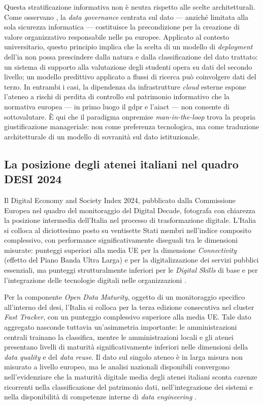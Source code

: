 Questa stratificazione informativa non è neutra rispetto alle scelte architetturali.
Come osservano \textcite{Aguilar2026}, la \textit{data governance} centrata sul dato
--- anziché limitata alla sola sicurezza informatica --- costituisce la precondizione per
la creazione di valore organizzativo responsabile nelle \gls{pa} europee. Applicato al contesto
universitario, questo principio implica che la scelta di un modello di \textit{deployment}
dell'\gls{ia} non possa prescindere dalla natura e dalla classificazione del dato trattato: un
sistema di supporto alla valutazione degli studenti opera su dati del secondo livello;
un modello predittivo applicato a flussi di ricerca può coinvolgere dati del terzo. In
entrambi i casi, la dipendenza da infrastrutture \textit{cloud} esterne espone l'ateneo a
rischi di perdita di controllo sul patrimonio informativo che la normativa europea
--- in primo luogo il \gls{gdpr} e l'\gls{aiact} --- non consente di sottovalutare. È qui che il
paradigma \gls{onpremise} \textit{man-in-the-loop} trova la propria giustificazione
manageriale: non come preferenza tecnologica, ma come traduzione architetturale di un
modello di sovranità sul dato istituzionale.

\subsection{La posizione degli atenei italiani nel quadro DESI 2024}

Il Digital Economy and Society Index 2024, pubblicato dalla Commissione Europea nel
quadro del monitoraggio del Digital Decade, fotografa con chiarezza la posizione
intermedia dell'Italia nel processo di trasformazione digitale. L'Italia si colloca al
diciottesimo posto su ventisette Stati membri nell'indice composito complessivo, con
performance significativamente diseguali tra le dimensioni misurate: punteggi superiori
alla media UE per la dimensione \textit{Connectivity} (effetto del Piano Banda Ultra
Larga) e per la digitalizzazione dei servizi pubblici essenziali, ma punteggi
strutturalmente inferiori per le \textit{Digital Skills} di base e per l'integrazione
delle tecnologie digitali nelle organizzazioni \parencite{DESI2024}.

Per la componente \textit{Open Data Maturity}, oggetto di un monitoraggio specifico
all'interno del \gls{desi}, l'Italia si colloca per la terza edizione consecutiva nel cluster
\textit{Fast Tracker}, con un punteggio complessivo superiore alla media UE. Tale dato
aggregato nasconde tuttavia un'asimmetria importante: le amministrazioni centrali
trainano la classifica, mentre le amministrazioni locali e gli atenei presentano livelli
di maturità significativamente inferiori nelle dimensioni della \textit{data quality} e
del \textit{data reuse}. Il dato sul singolo ateneo è in larga misura non misurato a
livello europeo, ma le analisi nazionali disponibili convergono nell'evidenziare che
la maturità digitale media degli atenei italiani sconta carenze ricorrenti nella
classificazione del patrimonio dati, nell'integrazione dei sistemi e nella disponibilità
di competenze interne di \textit{data engineering} \parencite{McNicol2024DataEthics}.

